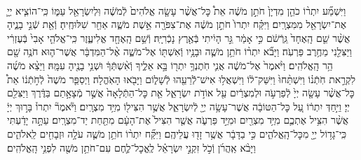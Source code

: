 \documentclass[twoside, openany, parskip=half, 11pt]{book}
\begin{document}
\begin{sometimes}
\begin{footnotesize}
\begin{multicols}{2}
\\
וַיִּשְׁמַ֞ע יִתְר֨וֹ כֹהֵ֤ן מִדְיָן֙ חֹתֵ֣ן מֹשֶׁ֔ה אֵת֩ כׇּל־אֲשֶׁ֨ר עָשָׂ֤ה אֱלֹהִים֙ לְֿמֹשֶׁ֔ה וּֽלְיִשְׂרָאֵ֖ל עַמּ֑וֹ כִּֽי־הוֹצִ֧יא יְיָ֛ אֶת־יִשְׂרָאֵ֖ל מִמִּצְרָֽיִם׃ וַיִּקַּ֗ח יִתְרוֹ֙ חֹתֵ֣ן מֹשֶׁ֔ה אֶת־צִפֹּרָ֖ה אֵ֣שֶׁת מֹשֶׁ֑ה אַחַ֖ר שִׁלּוּחֶֽיהָ׃ וְֿאֵ֖ת שְֿׁנֵ֣י בָנֶ֑יהָ אֲשֶׁ֨ר שֵׁ֤ם הָֽאֶחָד֙ גֵּֽרְֿשֹׁ֔ם כִּ֣י אָמַ֔ר גֵּ֣ר הָיִ֔יתִי בְּֿאֶ֖רֶץ נָכְֿרִיָּֽה׃ וְֿשֵׁ֥ם הָֽאֶחָ֖ד אֱלִיעֶ֑זֶר כִּֽי־אֱלֹהֵ֤י אָבִי֙ בְּֿעֶזְרִ֔י וַיַּצִּלֵ֖נִי מֵחֶ֥רֶב פַּרְעֹֽה׃  וַיָּבֹ֞א יִתְר֨וֹ חֹתֵ֥ן מֹשֶׁ֛ה וּבָנָ֥יו וְֿאִשְׁתּ֖וֹ אֶל־מֹשֶׁ֑ה אֶ֨ל־הַמִּדְבָּ֔ר אֲשֶׁר־ה֛וּא חֹנֶ֥ה שָׁ֖ם הַ֥ר הָֽאֱלֹהִֽים׃ וַיֹּ֨אמֶר֙ אֶל־מֹשֶׁ֔ה אֲנִ֛י חֹֽתֶנְךָ֥ יִתְר֖וֹ בָּ֣א אֵלֶ֑יךָ וְֿאִ֨שְׁתְּֿךָ֔ וּשְׁנֵ֥י בָנֶ֖יהָ עִמָּֽהּ׃ וַיֵּצֵ֨א מֹשֶׁ֜ה לִקְרַ֣את חֹֽתְֿנ֗וֹ וַיִּשְׁתַּ֨חוּ֙ וַיִּשַּׁק־ל֔וֹ וַיִּשְׁאֲל֥וּ אִישׁ־לְֿֿרֵעֵ֖הוּ לְֿשָׁל֑וֹם וַיָּבֹ֖אוּ הָאֹֽהֱלָה׃ וַיְסַפֵּ֤ר מֹשֶׁה֙ לְֿחֹ֣תְֿנ֔וֹ אֵת֩ כׇּל־אֲשֶׁ֨ר עָשָׂ֤ה יְיָ֙ לְֿפַרְעֹ֣ה וּלְמִצְרַ֔יִם עַ֖ל אוֹדֹ֣ת יִשְׂרָאֵ֑ל אֵ֤ת כׇּל־הַתְּֿלָאָה֙ אֲשֶׁ֣ר מְֿצָאָ֣תַם בַּדֶּ֔רֶךְ וַיַּצִּלֵ֖ם יְיָ׃  וַיִּ֣חַדְּ יִתְר֔וֹ עַ֚ל כׇּל־הַטּוֹבָ֔ה אֲשֶׁר־עָשָׂ֥ה יְיָ֖ לְֿיִשְׂרָאֵ֑ל אֲשֶׁ֥ר הִצִּיל֖וֹ מִיַּ֥ד מִצְרָֽיִם׃ וַיֹּ֘אמֶר֘ יִתְרוֹ֒ בָּר֣וּךְ יְיָ֔ אֲשֶׁ֨ר הִצִּ֥יל אֶתְכֶ֛ם מִיַּ֥ד מִצְרַ֖יִם וּמִיַּ֣ד פַּרְעֹ֑ה אֲשֶׁ֤ר הִצִּיל֙ אֶת־הָעָ֔ם מִתַּ֖חַת יַד־מִצְרָֽיִם׃ עַתָּ֣ה יָדַ֔עְתִּי כִּֽי־גָד֥וֹל יְיָ֖ מִכׇּל־הָֽאֱלֹהִ֑ים כִּ֣י בַדָּבָ֔ר אֲשֶׁ֥ר זָד֖וּ עֲלֵיהֶֽם׃ וַיִּקַּ֞ח יִתְר֨וֹ חֹתֵ֥ן מֹשֶׁ֛ה עֹלָ֥ה וּזְבָחִ֖ים לֵֽאלֹהִ֑ים וַיָּבֹ֨א אַֽהֲרֹ֜ן וְֿכֹ֣ל זִקְנֵ֣י יִשְׂרָאֵ֗ל לֶֽאֱכׇל־לֶ֛חֶם עִם־חֹתֵ֥ן מֹשֶׁ֖ה לִפְנֵ֥י הָֽאֱלֹהִֽים׃


\end{multicols}
\end{footnotesize}
\end{sometimes}
\end{document}
